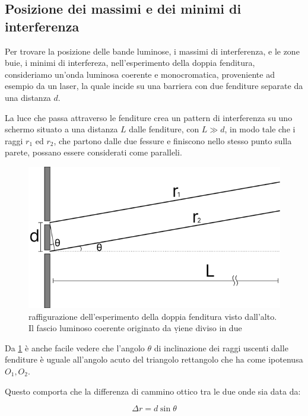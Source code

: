 \documentclass[12pt,a4paper]{report}
\begin{document}
\subsection{Posizione dei massimi e dei minimi di interferenza}

Per trovare la posizione delle bande luminose, i massimi di interferenza, e le zone buie, i minimi di interfereza, nell'esperimento della doppia fenditura, consideriamo un'onda luminosa coerente e monocromatica, proveniente ad esempio da un laser, la quale incide su una barriera con due fenditure separate da una distanza \(d\). 

La luce che passa attraverso le fenditure crea un pattern di interferenza su uno schermo situato a una distanza \(L\) dalle fenditure, con \(L \gg d \), in modo tale che i raggi \(r_1\) ed \(r_2\), che partono dalle due fessure e finiscono nello stesso punto sulla parete, possano essere considerati come paralleli.

\begin{figure}[!ht]
    \centering
    \includegraphics[width=\linewidth]{Immagini/double_slit_setup.png}
    \captionsetup{width=.8\linewidth}
    \caption{raffigurazione dell'esperimento della doppia fenditura visto dall'alto. Il fascio luminoso coerente originato da \d viene diviso in due }
    \label{fig:doubleSlitSetup}
\end{figure}

Da \cref{fig:doubleSlitSetup} è anche facile vedere che l'angolo \(\theta\) di inclinazione dei raggi uscenti dalle fenditure è uguale all'angolo acuto del triangolo rettangolo che ha come ipotenusa \(O_1, O_2 \).

Questo comporta che la differenza di cammino ottico tra le due onde sia data da:

\[ \Delta r = d \sin \theta \]
\end{document}
